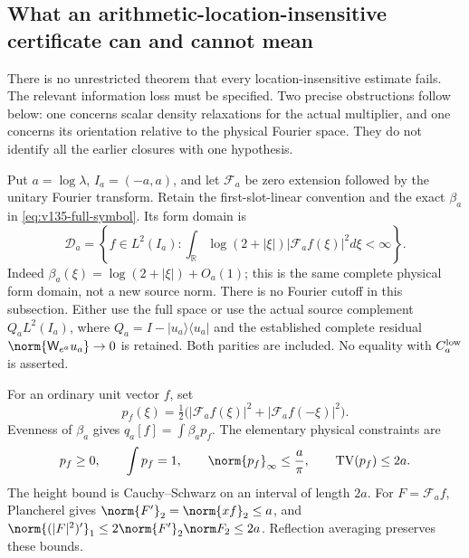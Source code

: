 \subsection*{What an arithmetic-location-insensitive certificate can and cannot mean}

There is no unrestricted theorem that every location-insensitive estimate
fails. The relevant information loss must be specified. Two precise
obstructions follow below: one concerns scalar density relaxations for
the actual multiplier, and one concerns its orientation relative to the
physical Fourier space. They do not identify all the earlier closures
with one hypothesis.

Put $a=\log\lambda$, $I_a=(-a,a)$, and let $\mathcal F_a$ be zero
extension followed by the unitary Fourier transform. Retain the
first-slot-linear convention and the exact $\beta_a$ in
\eqref{eq:v135-full-symbol}. Its form domain is
\[
 \mathcal D_a=\left\{f\in L^2(I_a):
 \int_{\mathbb R}\log(2+|\xi|)|\mathcal F_af(\xi)|^2d\xi<\infty\right\}.
\]
Indeed $\beta_a(\xi)=\log(2+|\xi|)+O_a(1)$; this is the same
complete physical form domain, not a new source norm. There is no
Fourier cutoff in this subsection. Either use the full space or use
the actual source complement $Q_aL^2(I_a)$, where
$Q_a=I-|u_a\rangle\langle u_a|$ and the established complete
residual $\norm{\mathsf W_{e^a}u_a}\to0$ is retained. Both parities
are included. No equality with $C_a^{\rm low}$ is asserted.

For an ordinary unit vector $f$, set
\[
 p_f(\xi)=\tfrac12\bigl(|\mathcal F_af(\xi)|^2+
                               |\mathcal F_af(-\xi)|^2\bigr).
\]
Evenness of $\beta_a$ gives $q_a[f]=\int\beta_ap_f$. The elementary
physical constraints are
\begin{equation}\label{eq:v139-density-constraints}
 p_f\ge0,\qquad \int p_f=1,\qquad
 \norm{p_f}_\infty\le\frac a\pi,\qquad
 \operatorname{TV}(p_f)\le2a.
\end{equation}
The height bound is Cauchy--Schwarz on an interval of length $2a$.
For $F=\mathcal F_af$, Plancherel gives
$\norm{F'}_2=\norm{xf}_2\le a$, and
$\norm{(|F|^2)'}_1\le2\norm{F'}_2\norm F_2\le2a$.
Reflection averaging preserves these bounds.

